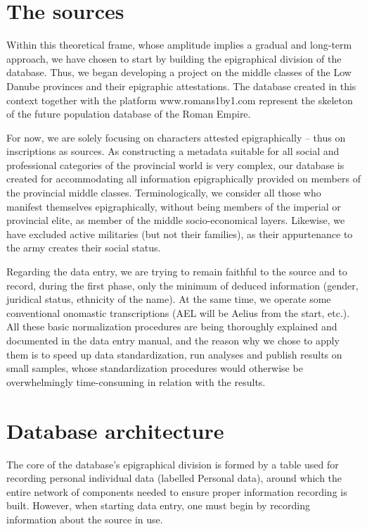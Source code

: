 \documentclass[amsthm,ebook]{saparticle}
\begin{document}
\section{The sources}

\noindent Within this theoretical frame, whose amplitude implies a gradual and long-term approach, we have chosen to start by
building the epigraphical division of the database. Thus, we began developing a project on the middle classes of the
Low Danube provinces and their epigraphic attestations. The database created in this context together with the platform
www.romans1by1.com represent the skeleton of the future population database of the Roman Empire.

For now, we are solely focusing on characters attested epigraphically – thus on inscriptions as sources. As constructing
a metadata suitable for all social and professional categories of the provincial world is very complex, our database is
created for accommodating all information epigraphically provided on members of the provincial middle classes.
Terminologically, we consider all those who manifest themselves epigraphically, without being members of the imperial
or provincial elite, as member of the middle socio-economical layers. Likewise, we have excluded active militaries (but
not their families), as their appurtenance to the army creates their social status.

Regarding the data entry, we are trying to remain faithful to the source and to record, during the first phase, only the
minimum of deduced information (gender, juridical status, ethnicity of the name). At the same time, we operate some
conventional onomastic transcriptions (AEL will be Aelius from the start, etc.). All these basic normalization
procedures are being thoroughly explained and documented in the data entry manual, and the reason why we chose to apply
them is to speed up data standardization, run analyses and publish results on small samples, whose standardization
procedures would otherwise be overwhelmingly time-consuming in relation with the results.

\section{Database architecture}

\noindent The core of the database’s epigraphical division is formed by a table used for recording personal
individual data (labelled Personal data), around which the entire network of components needed to ensure proper
information recording is built. However, when starting data entry, one must begin by recording information about the
source in use.
\end{document}
